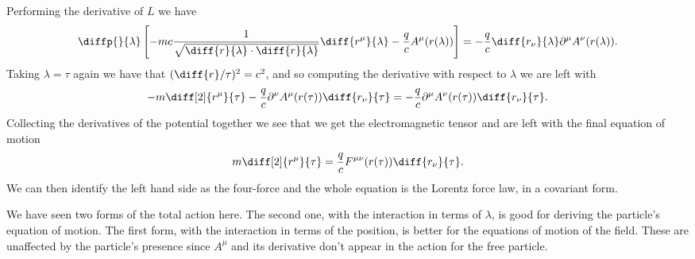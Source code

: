 \documentclass[fleqn]{NotesClass}
\newcommand*{\lagrangian}{L}
\begin{document}
    Performing the derivative of \(\lagrangian\) we have
    \begin{equation}
        \diffp{}{\lambda} \left[ -mc \frac{1}{\sqrt{\diff{r}{\lambda} \cdot \diff{r}{\lambda}}} \diff{r^\mu}{\lambda} - \frac{q}{c}A^\mu(r(\lambda)) \right] = -\frac{q}{c} \diff{r_\nu}{\lambda} \partial^\mu A^\nu(r(\lambda)).
    \end{equation}
    Taking \(\lambda = \tau\) again we have that \((\diff{r}/{\tau})^2 = c^2\), and so computing the derivative with respect to \(\lambda\) we are left with
    \begin{equation}
        -m\diff[2]{r^\mu}{\tau} - \frac{q}{c}\partial^\nu A^\mu(r(\tau)) \diff{r_\nu}{\tau} = -\frac{q}{c}\partial^\mu A^\nu(r(\tau)) \diff{r_\nu}{\tau}.
    \end{equation}
    Collecting the derivatives of the potential together we see that we get the electromagnetic tensor and are left with the final equation of motion
    \begin{equation}
        m \diff[2]{r^\mu}{\tau} = \frac{q}{c}F^{\mu\nu}(r(\tau)) \diff{r_\nu}{\tau}.
    \end{equation}
    We can then identify the left hand side as the four-force and the whole equation is the Lorentz force law, in a covariant form.
    
    We have seen two forms of the total action here.
    The second one, with the interaction in terms of \(\lambda\), is good for deriving the particle's equation of motion.
    The first form, with the interaction in terms of the position, is better for the equations of motion of the field.
    These are unaffected by the particle's presence since \(A^\mu\) and its derivative don't appear in the action for the free particle.
    
    \backmatter
    \printindex
\end{document}
